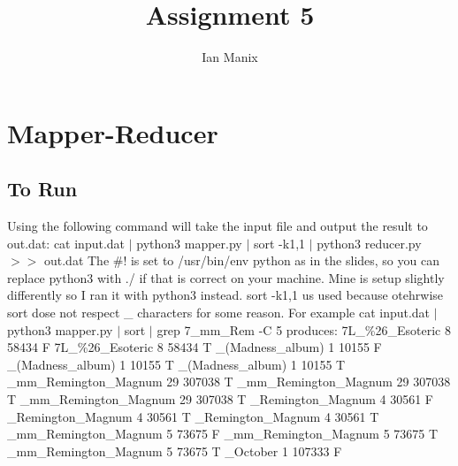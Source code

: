 \documentclass{article}
\title{Assignment 5}
\author{Ian Manix}
\begin{document}
\maketitle

\section{Mapper-Reducer}
\subsection{To Run}
\label{subsec:run}

Using the following command will take the input file and output the result to out.dat:
\newline
cat input.dat $|$ python3 mapper.py $|$ sort -k1,1 $|$ python3 reducer.py $>>$ out.dat
\newline
The \#! is set to /usr/bin/env python as in the slides, so you can replace python3 with ./ if that is correct on your machine. Mine is setup slightly differently so I ran it with python3 instead. sort -k1,1 us used because otehrwise sort dose not respect \_ characters for some reason. For example cat input.dat $|$ python3 mapper.py $|$ sort $|$ grep 7\_mm\_Rem -C 5 produces:
\newline
\newline
7L\_\%26\_Esoteric	8	58434	F
\newline
7L\_\%26\_Esoteric	8	58434	T
\_(Madness\_album)	1	10155	F
\_(Madness\_album)	1	10155	T
\_(Madness\_album)	1	10155	T
\_mm\_Remington\_Magnum	29	307038	T
\_mm\_Remington\_Magnum	29	307038	T
\_mm\_Remington\_Magnum	29	307038	T
\newline
7mm\_Remington\_Magnum	4	30561	F
\newline
7mm\_Remington\_Magnum	4	30561	T
\newline
7mm\_Remington\_Magnum	4	30561	T
\_mm\_Remington\_Magnum	5	73675	F
\_mm\_Remington\_Magnum	5	73675	T
\_mm\_Remington\_Magnum	5	73675	T
\_October	1	107333	F
\newline
\end{document}
